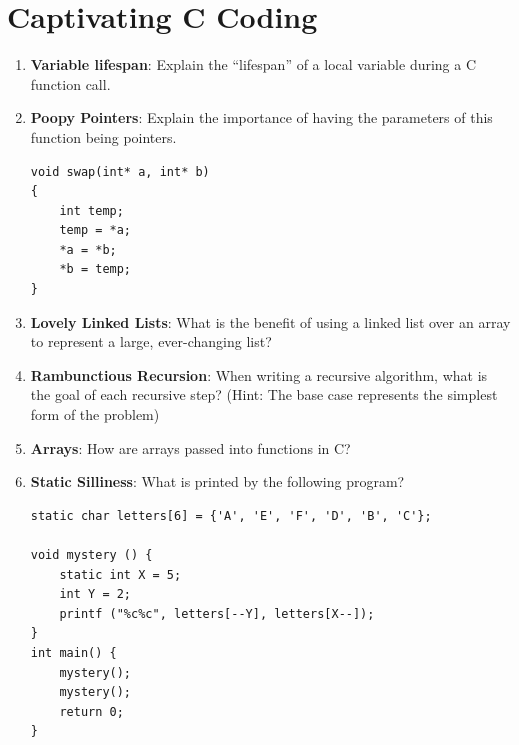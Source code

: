 \documentclass{article}
\begin{document}
\section{Captivating C Coding}
\begin{enumerate}[label=(\alph*), itemsep = 120pt]
    \item \textbf{Variable lifespan}: Explain the “lifespan” of a local variable during a C function call.
    
    
    \item \textbf{Poopy Pointers}: Explain the importance of having the parameters of this function being pointers.
    
    \begin{lstlisting}[style=CStyle]
void swap(int* a, int* b)
{
    int temp;
    temp = *a;
    *a = *b;
    *b = temp;
} \end{lstlisting}

    
 
    \item \textbf{Lovely Linked Lists}: What is the benefit of using a linked list over an array to represent a large, ever-changing list?
    
    \item \textbf{Rambunctious Recursion}: When writing a recursive algorithm, what is the goal of each recursive step? (Hint: The base case represents the simplest form of the problem)
    
    \item \textbf{Arrays}: How are arrays passed into functions in C?
    
    \item \textbf{Static Silliness}:  What is printed by the following program?
    \begin{lstlisting}[style=CStyle] 
static char letters[6] = {'A', 'E', 'F', 'D', 'B', 'C'};

void mystery () {
    static int X = 5;
    int Y = 2;
    printf ("%c%c", letters[--Y], letters[X--]);
}
int main() {
    mystery();
    mystery();
    return 0;
}
 \end{lstlisting}
    

\end{enumerate}
\end{document}
